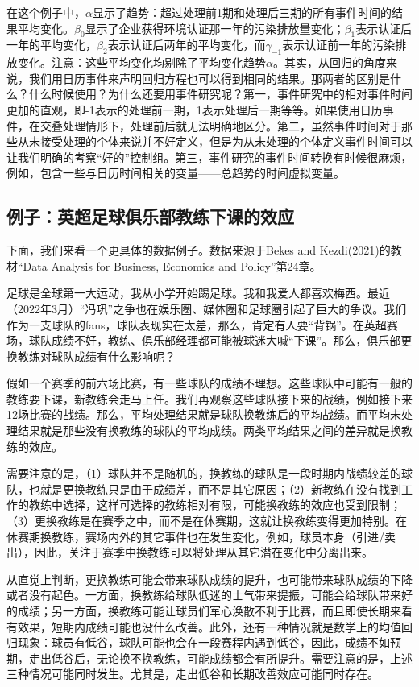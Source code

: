 \documentclass[cn,12pt,math=newtx,citestyle=gb7714-2015,bibstyle=gb7714-2015]{elegantbook}
\begin{document}
	    在这个例子中，$\alpha$显示了趋势：超过处理前1期和处理后三期的所有事件时间的结果平均变化。$\beta_0$显示了企业获得环境认证那一年的污染排放量变化；$\beta_1$表示认证后一年的平均变化，$\beta_2$表示认证后两年的平均变化，而$\gamma_{-1}$表示认证前一年的污染排放变化。注意：这些平均变化均剔除了平均变化趋势$\alpha$。其实，从回归的角度来说，我们用日历事件来声明回归方程也可以得到相同的结果。那两者的区别是什么？什么时候使用？为什么还要用事件研究呢？第一，事件研究中的相对事件时间更加的直观，即-1表示的处理前一期，1表示处理后一期等等。如果使用日历事件，在交叠处理情形下，处理前后就无法明确地区分。第二，虽然事件时间对于那些从未接受处理的个体来说并不好定义，但是为从未处理的个体定义事件时间可以让我们明确的考察“好的”控制组。第三，事件研究的事件时间转换有时候很麻烦，例如，包含一些与日历时间相关的变量——总趋势的时间虚拟变量。
	    
	    \subsection*{例子：英超足球俱乐部教练下课的效应}
	    
	    下面，我们来看一个更具体的数据例子。数据来源于Bekes and Kezdi(2021)的教材“Data Analysis for Business, Economics and Policy”第24章。
	    
	    足球是全球第一大运动，我从小学开始踢足球。我和我爱人都喜欢梅西。最近（2022年3月）“冯巩”之争也在娱乐圈、媒体圈和足球圈引起了巨大的争议。我们作为一支球队的fans，球队表现实在太差，那么，肯定有人要“背锅”。在英超赛场，球队成绩不好，教练、俱乐部经理都可能被球迷大喊“下课”。那么，俱乐部更换教练对球队成绩有什么影响呢？
	    
	    假如一个赛季的前六场比赛，有一些球队的成绩不理想。这些球队中可能有一般的教练要下课，新教练会走马上任。我们再观察这些球队接下来的战绩，例如接下来12场比赛的战绩。那么，平均处理结果就是球队换教练后的平均战绩。而平均未处理结果就是那些没有换教练的球队的平均成绩。两类平均结果之间的差异就是换教练的效应。
	    
	    需要注意的是，（1）球队并不是随机的，换教练的球队是一段时期内战绩较差的球队，也就是更换教练只是由于成绩差，而不是其它原因；（2）新教练在没有找到工作的教练中选择，这样可选择的教练相对有限，可能换教练的效应也受到限制；（3）更换教练是在赛季之中，而不是在休赛期，这就让换教练变得更加特别。在休赛期换教练，赛场内外的其它事件也在发生变化，例如，球员本身（引进/卖出），因此，关注于赛季中换教练可以将处理从其它潜在变化中分离出来。
	    
	    从直觉上判断，更换教练可能会带来球队成绩的提升，也可能带来球队成绩的下降或者没有起色。一方面，换教练给球队低迷的士气带来提振，可能会给球队带来好的成绩；另一方面，换教练可能让球员们军心涣散不利于比赛，而且即使长期来看有效果，短期内成绩可能也没什么改善。此外，还有一种情况就是数学上的均值回归现象：球员有低谷，球队可能也会在一段赛程内遇到低谷，因此，成绩不如预期，走出低谷后，无论换不换教练，可能成绩都会有所提升。需要注意的是，上述三种情况可能同时发生。尤其是，走出低谷和长期改善效应可能同时存在。
	    
\end{document}
